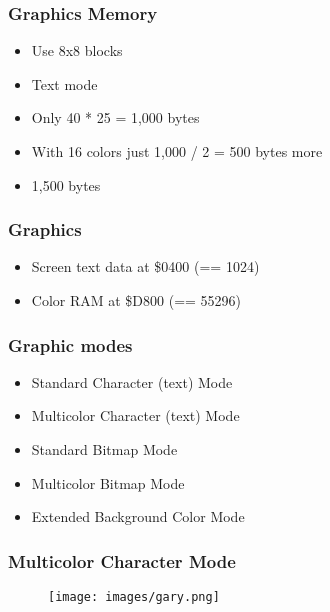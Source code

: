 
\begin{frame}
\frametitle{Graphics Memory}

\begin{itemize}
\item Use 8x8 blocks
\item Text mode
\item Only 40 * 25 = 1,000 bytes
\item With 16 colors just 1,000 / 2 = 500 bytes more
\item 1,500 bytes
\end{itemize}

\end{frame}


\begin{frame}
\frametitle{Graphics}

\begin{itemize}
\item Screen text data at \$0400 (== 1024)
\item Color RAM at \$D800 (== 55296)
\end{itemize}

\end{frame}


\begin{frame}
\frametitle{Graphic modes}

\begin{itemize}
\item Standard Character (text) Mode
\item Multicolor Character (text) Mode
\item Standard Bitmap Mode
\item Multicolor Bitmap Mode
\item Extended Background Color Mode
\end{itemize}

\end{frame}


\begin{frame}
\frametitle{Multicolor Character Mode}

\begin{figure}
\texttt{[image: images/gary.png]}
\end{figure}

\end{frame}

